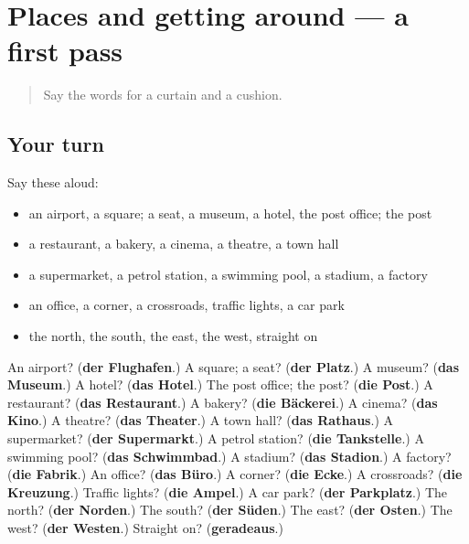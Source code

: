 \section[(dialogue)]{Places and getting around — a first pass}

\label{lesson:GE-R113-first-pass-places-and-getting-around}



\begin{quote}
Say the words for a curtain and a cushion.
\end{quote}

\subsection*{Your turn}
Say these aloud:

\begin{itemize}
\raggedright
  \item an airport, a square; a seat, a museum, a hotel, the post office; the post
  \item a restaurant, a bakery, a cinema, a theatre, a town hall
  \item a supermarket, a petrol station, a swimming pool, a stadium, a factory
  \item an office, a corner, a crossroads, traffic lights, a car park
  \item the north, the south, the east, the west, straight on
\end{itemize}

\begin{tcolorbox}[breakable,colback=teal!4,colframe=teal!35!black,title={Before you move on}]
An airport? (\textbf{der Flughafen}.) A square; a seat? (\textbf{der Platz}.) A museum? (\textbf{das Museum}.) A hotel? (\textbf{das Hotel}.) The post office; the post? (\textbf{die Post}.) A restaurant? (\textbf{das Restaurant}.) A bakery? (\textbf{die Bäckerei}.) A cinema? (\textbf{das Kino}.) A theatre? (\textbf{das Theater}.) A town hall? (\textbf{das Rathaus}.) A supermarket? (\textbf{der Supermarkt}.) A petrol station? (\textbf{die Tankstelle}.) A swimming pool? (\textbf{das Schwimmbad}.) A stadium? (\textbf{das Stadion}.) A factory? (\textbf{die Fabrik}.) An office? (\textbf{das Büro}.) A corner? (\textbf{die Ecke}.) A crossroads? (\textbf{die Kreuzung}.) Traffic lights? (\textbf{die Ampel}.) A car park? (\textbf{der Parkplatz}.) The north? (\textbf{der Norden}.) The south? (\textbf{der Süden}.) The east? (\textbf{der Osten}.) The west? (\textbf{der Westen}.) Straight on? (\textbf{geradeaus}.)
\end{tcolorbox}
